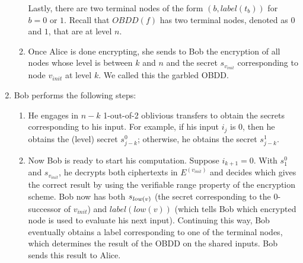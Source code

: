 \begin{enumerate}
\begin{enumerate}
Lastly, there are two terminal nodes of the form $(b,label(t_b))$ for
$b=0$ or $1$. Recall that $OBDD(f)$ has two terminal nodes, denoted as
$0$ and $1$, that are at level $n$.

\item Once Alice is done encrypting, she sends to Bob the encryption
of all nodes whose level is between $k$ and $n$ and the secret
$s_{v_{init}}$ corresponding to node $v_{init}$ at level $k$. We called
this the garbled OBDD.

\end{enumerate}

\item Bob performs the following steps:
\begin{enumerate}
\item He engages in $n-k$ 1-out-of-2 oblivious transfers to obtain the
secrets corresponding to his input. For example, if his input $i_j$ is
$0$, then he obtains the (level) secret $s_{j-k}^0$; otherwise, he
obtains the secret $s_{j-k}^1$.

\item Now Bob is ready to start his computation. Suppose
$i_{k+1}=0$. With $s_{1}^0$ and $s_{v_{init}}$, he decrypts both
ciphertexts in $E^{(v_{init})}$ and decides which gives the correct
result by using the verifiable range property of the encryption
scheme. Bob now has both $s_{{\it low}(v)}$ (the secret corresponding
to the $0$-successor of $v_{init}$) and $label(low(v))$ (which tells
Bob which encrypted node is used to evaluate his next
input). Continuing this way, Bob eventually obtains a label
corresponding to one of the terminal nodes, which determines the
result of the OBDD on the shared inputs. Bob sends this result to
Alice.
\end{enumerate}

\end{enumerate}

